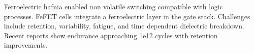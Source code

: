 Ferroelectric hafnia enabled non volatile switching compatible with logic processes. FeFET cells integrate a ferroelectric layer in the gate stack. Challenges include retention, variability, fatigue, and time dependent dielectric breakdown. Recent reports show endurance approaching 1e12 cycles with retention improvements.
